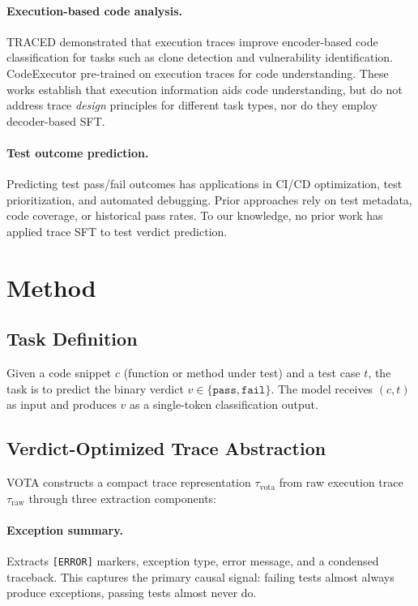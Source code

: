 \documentclass[11pt]{article}
\newcommand{\vota}{\textsc{VOTA}}
\begin{document}
\paragraph{Execution-based code analysis.}
TRACED \cite{traced2024} demonstrated that execution traces improve encoder-based code classification for tasks such as clone detection and vulnerability identification. CodeExecutor \cite{codeexecutor2024} pre-trained on execution traces for code understanding. These works establish that execution information aids code understanding, but do not address trace \emph{design} principles for different task types, nor do they employ decoder-based SFT.

\paragraph{Test outcome prediction.}
Predicting test pass/fail outcomes has applications in CI/CD optimization, test prioritization, and automated debugging. Prior approaches rely on test metadata, code coverage, or historical pass rates. To our knowledge, no prior work has applied trace SFT to test verdict prediction.

\section{Method}

\subsection{Task Definition}

Given a code snippet $c$ (function or method under test) and a test case $t$, the task is to predict the binary verdict $v \in \{\texttt{pass}, \texttt{fail}\}$. The model receives $(c, t)$ as input and produces $v$ as a single-token classification output.

\subsection{Verdict-Optimized Trace Abstraction}

\vota{} constructs a compact trace representation $\tau_{\text{vota}}$ from raw execution trace $\tau_{\text{raw}}$ through three extraction components:

\paragraph{Exception summary.} Extracts \texttt{[ERROR]} markers, exception type, error message, and a condensed traceback. This captures the primary causal signal: failing tests almost always produce exceptions, passing tests almost never do.
\end{document}
